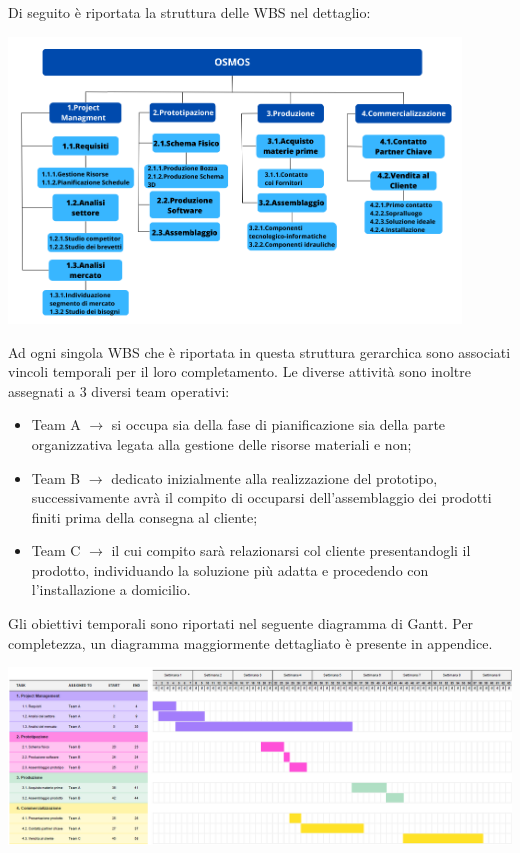 \documentclass[a4paper, 12pt]{article}
\begin{document}
	Di seguito è riportata la struttura delle WBS nel dettaglio:
	\begin{center}
		\includegraphics[width=0.9\textwidth]{Images/WBS.png}
	\end{center}
	Ad ogni singola WBS che è riportata in questa struttura gerarchica sono associati vincoli temporali per il loro completamento. Le diverse attività sono inoltre assegnati a 3 diversi team operativi:
	\begin{itemize}
		\item Team A $\rightarrow$ si occupa sia della fase di pianificazione sia della parte organizzativa legata alla gestione delle risorse materiali e non;
		\item Team B $\rightarrow$ dedicato inizialmente alla realizzazione del prototipo, successivamente avrà il compito di occuparsi dell'assemblaggio dei prodotti finiti prima della consegna al cliente;
		\item Team C $\rightarrow$ il cui compito sarà relazionarsi col cliente presentandogli il prodotto, individuando la soluzione più adatta e procedendo con l'installazione a domicilio.
	\end{itemize}
	Gli obiettivi temporali sono riportati nel seguente diagramma di Gantt. Per completezza, un diagramma maggiormente dettagliato è presente in appendice.
	\begin{center}
		\includegraphics[width=\textwidth]{Images/gantt.png}
	\end{center}
	\newpage
\end{document}

